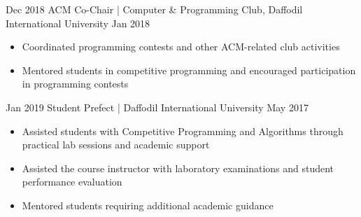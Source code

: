 %
%
%


\begin{experiences}

  \mentoring
    {Dec 2018}
    {ACM Co-Chair | Computer \& Programming Club, Daffodil International University}
    {Jan 2018}
    {
      \begin{itemize}
        \item Coordinated programming contests and other ACM-related club activities

        \item Mentored students in competitive programming and encouraged participation
              in programming contests
      \end{itemize}
    }

  \emptySeparator

  \mentoring
  {Jan 2019}
  {Student Prefect | Daffodil International University}
  {May 2017}
  {
    \begin{itemize}
      \item Assisted students with Competitive Programming and Algorithms through
            practical lab sessions and academic support

      \item Assisted the course instructor with laboratory examinations and
            student performance evaluation

      \item Mentored students requiring additional academic guidance
    \end{itemize}
  }

\end{experiences}
